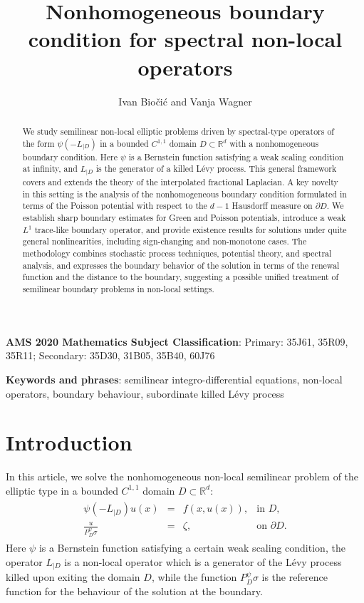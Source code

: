 \documentclass[12pt,a4paper,onecolumn]{article}
\title{Nonhomogeneous boundary condition for spectral non-local operators}
\author{Ivan Bio\v{c}i\'{c} and Vanja Wagner}
\date{}
\theoremstyle{definition}
\newcommand{\R}{\mathbb{R}}
\newcommand{\1}{\mathbf 1}
\newcommand{\Lbase}{L_{|D}}
\newcommand{\Lo}{\psi(-L_{|D})}
\newcommand{\PDS}{P^{\psi}_{ D}}
\numberwithin{equation}{section}
\begin{document}
	\maketitle

    \begin{abstract}
    We study semilinear non-local elliptic problems driven by spectral-type operators of the form $\psi(-L_{|D})$ in a bounded $C^{1,1}$ domain $D\subset \R^d$ with a nonhomogeneous boundary condition. Here $\psi$ is a Bernstein function satisfying a weak scaling condition at infinity, and $L_{|D}$ is the generator of a killed L\'evy process. This general framework covers and extends the theory of the interpolated fractional Laplacian. A key novelty in this setting is the analysis of the nonhomogeneous boundary condition formulated in terms of the Poisson potential with respect to the $d-1$ Hausdorff measure on $\partial D$. We establish sharp boundary estimates for Green and Poisson potentials, introduce a weak $L^1$ trace-like boundary operator, and provide existence results for solutions under quite general nonlinearities, including sign-changing and non-monotone cases. The methodology combines stochastic process techniques, potential theory, and spectral analysis, and expresses the boundary behavior of the solution in terms of the renewal function and the distance to the boundary, suggesting a possible unified treatment of semilinear boundary problems in non-local settings.
\end{abstract}

\bigskip\noindent
{\bf AMS 2020 Mathematics Subject Classification}: Primary: 35J61, 35R09, 35R11; Secondary: 35D30, 31B05, 35B40, 60J76

	
\bigskip\noindent
{\bf Keywords and phrases}: semilinear integro-differential equations, non-local operators, boundary behaviour, subordinate killed L\'evy process
	
	\section{Introduction}
	In this article, we solve the nonhomogeneous non-local semilinear problem of the elliptic type in a bounded $C^{1,1}$ domain $D\subset \R^d$:
    \begin{align}
			\begin{array}{rcll}\label{intro-eqn}
				\Lo u(x)&=&f(x,u(x)),&\textrm{in $D$},\\
				\frac{u}{\PDS\sigma}&=&\zeta,&\textrm{on $\partial D$}.
			\end{array}
	\end{align}
    Here $\psi$ is a Bernstein function satisfying a certain weak scaling condition, the operator $\Lbase$ is a non-local operator which is a generator of the L\'evy process killed upon exiting the domain $D$, while the function $\PDS \sigma$ is the reference function for the behaviour of the solution at the boundary.
\end{document}

